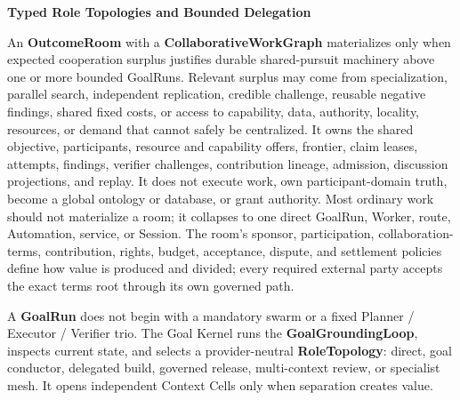 \documentclass[
  11pt,
]{article}
\begin{document}
\textbf{Typed Role Topologies and Bounded Delegation}

An \textbf{OutcomeRoom} with a \textbf{CollaborativeWorkGraph} materializes
only when expected cooperation surplus justifies durable shared-pursuit
machinery above one or more bounded GoalRuns. Relevant surplus may come from
specialization, parallel search, independent replication, credible challenge,
reusable negative findings, shared fixed costs, or access to capability, data,
authority, locality, resources, or demand that cannot safely be centralized. It
owns the shared objective, participants, resource and capability offers,
frontier, claim leases, attempts, findings, verifier challenges,
contribution lineage, admission, discussion projections, and replay. It
does not execute work, own participant-domain truth, become a global
ontology or database, or grant authority. Most ordinary work should not
materialize a room; it collapses to one direct GoalRun, Worker, route,
Automation, service, or Session. The room's sponsor, participation,
collaboration-terms, contribution, rights, budget, acceptance, dispute, and
settlement policies define how value is produced and divided; every required
external party accepts the exact terms root through its own governed path.

A \textbf{GoalRun} does not begin with a mandatory swarm or a fixed Planner /
Executor / Verifier trio. The Goal Kernel runs the
\textbf{GoalGroundingLoop}, inspects current state, and selects a
provider-neutral \textbf{RoleTopology}: direct, goal conductor, delegated
build, governed release, multi-context review, or specialist mesh. It opens
independent Context Cells only when separation creates value.
\end{document}
